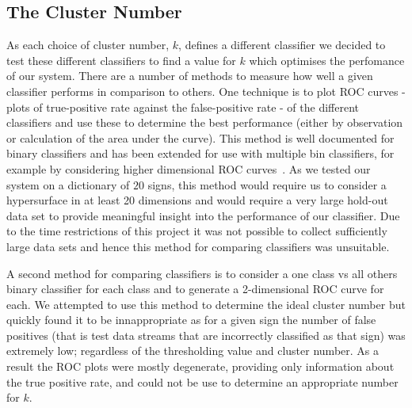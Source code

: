 \subsection{The Cluster Number}
As each choice of cluster number, $k$, defines a different classifier we decided to test these different classifiers to find a value for $k$ which optimises the perfomance of our system. There are a number of methods to measure how well a given classifier performs in comparison to others. One technique is to plot ROC curves - plots of true-positive rate against the false-positive rate - of the different classifiers and use these to determine the best performance (either by observation or calculation of the area under the curve). This method is well documented for binary classifiers and has been extended for use with multiple bin classifiers, for example by considering higher dimensional ROC curves~\citep{landgrebe2006simplified}. As we tested our system on a dictionary of $20$ signs, this method would require us to consider a hypersurface in at least 20 dimensions and would require a very large hold-out data set to provide meaningful insight into the performance of our classifier. Due to the time restrictions of this project it was not possible to collect sufficiently large data sets and hence this method for comparing classifiers was unsuitable. 

A second method for comparing classifiers is to consider a one class vs all others binary classifier for each class and to generate a 2-dimensional ROC curve for each. We attempted to use this method to determine the ideal cluster number but quickly found it to be innappropriate as for a given sign the number of false positives (that is test data streams that are incorrectly classified as that sign) was extremely low; regardless of the thresholding value and cluster number. As a result the ROC plots were mostly degenerate, providing only information about the true positive rate, and could not be use to determine an appropriate number for $k$.

